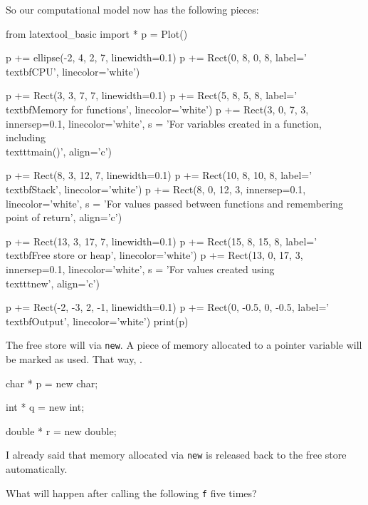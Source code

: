 So our computational model now has the following pieces:
\begin{python}
from latextool_basic import *
p = Plot()

p += ellipse(-2, 4, 2, 7, linewidth=0.1)
p += Rect(0, 8, 0, 8, label='\\textbf{CPU}', linecolor='white')

p += Rect(3, 3, 7, 7, linewidth=0.1)
p += Rect(5, 8, 5, 8, label='\\textbf{Memory for functions}', linecolor='white')
p += Rect(3, 0, 7, 3, innersep=0.1, linecolor='white', s = 'For variables created in a function, including \\texttt{main()}', align='c')

p += Rect(8, 3, 12, 7, linewidth=0.1)
p += Rect(10, 8, 10, 8, label='\\textbf{Stack}', linecolor='white')
p += Rect(8, 0, 12, 3, innersep=0.1, linecolor='white', s = 'For values passed between functions and remembering point of return', align='c')

p += Rect(13, 3, 17, 7, linewidth=0.1)
p += Rect(15, 8, 15, 8, label='\\textbf{Free store or heap}', linecolor='white')
p += Rect(13, 0, 17, 3, innersep=0.1, linecolor='white', s = 'For values created using \\texttt{new}', align='c')

p += Rect(-2, -3, 2, -1, linewidth=0.1)
p += Rect(0, -0.5, 0, -0.5, label='\\textbf{Output}', linecolor='white')
print(p)
\end{python}
The free store will  via \texttt{new}. A piece of memory allocated to a pointer variable will be marked as used. That way, .

char * p = new char;

int * q = new int;

double * r = new double;

\newpage{}

I already said that memory allocated via \texttt{new} is  released back to the free store automatically. 

What will happen after calling the following \texttt{f} five times?


